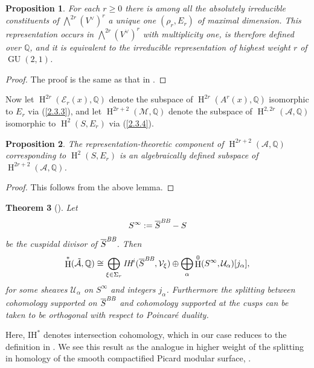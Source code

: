 \documentclass[12pt,a4paper,reqno]{amsart}
\theoremstyle{definition}
\numberwithin{definition}{subsection}
\theoremstyle{definition}
\numberwithin{Definition}{subsection}
\theoremstyle{remark}
\theoremstyle{remark}
\numberwithin{Remark}{subsection}
\theoremstyle{remark}
\theoremstyle{plain}
\newtheorem{Theorem}{Theorem}
\numberwithin{Theorem}{subsection}
\theoremstyle{plain}
\theoremstyle{plain}
\theoremstyle{plain}
\theoremstyle{plain}
\theoremstyle{plain}
\theoremstyle{plain}
\newtheorem{Proposition}[Theorem]{Proposition}
\theoremstyle{plain}
\newcommand*{\Q}{\mathbb{Q}}
\DeclareMathOperator{\GU}{GU}
\DeclareMathOperator{\h}{H}
\begin{document}
\begin{Proposition}
For each $r\geq 0$ there is among all the absolutely irreducible constituents of $\bigwedge^{2r} (V^{\vee})^r$ a unique one $(\rho_r, E_{r})$ of maximal dimension. This representation occurs in $\bigwedge^{2r} (V^{\vee})^r$ with multiplicity one, is therefore defined over $\Q$, and it is equivalent to the irreducible representation of highest weight $r$ of $\GU(2,1)$.
\end{Proposition}

\begin{proof}
The proof is the same as that in \cite[p. 16]{gordon}.
\end{proof}

Now let $\h^{2r}(\mathcal{E}_{r}(x),\Q)$ denote the subspace of $\h^{2r}(A^r(x),\Q)$ isomorphic to $E_{r}$ via (\ref{2.3.3}), and let $\h^{2r+2}(\mathcal{M}, \Q)$ denote the subspace of $\h^{2,2r}(\mathcal{A},\Q)$ isomorphic to $\h^2(S, E_{r})$ via (\ref{2.3.4}).

\begin{Proposition}
The representation-theoretic component of $\h^{2r+2}(\mathcal{A},\Q)$ corresponding to $\h^2(S, E_{r})$ is an algebraically defined subspace of $\h^{2r+2}(\mathcal{A},\Q)$.
\end{Proposition}

\begin{proof}
This follows from the above lemma.
\end{proof}

\begin{Theorem}[]
Let $$S^\infty:=\overline{S}^{\emph{BB}}-S$$
be the cuspidal divisor of $\overline{S}^{\emph{BB}}$. Then
\[
\h^{*}(\tilde{\mathcal{A}},\Q)\cong \bigoplus_{\xi\in \Sigma_r}\emph{IH}^i(\overline{S}^{\emph{BB}}, \mathcal{V}_\xi)\oplus \bigoplus_\alpha \h^0(S^\infty,\mathcal{U}_\alpha)[j_\alpha],
\]
for some sheaves $\mathcal{U}_\alpha$ on $S^\infty$ and integers $j_\alpha$. Furthermore the splitting between cohomology supported on $\overline{S}^{\emph{BB}}$ and cohomology supported at the cusps can be taken to be orthogonal with respect to Poincaré duality.
\end{Theorem}

Here, $\text{IH}^*$ denotes intersection cohomology, which in our case reduces to the definition in \cite[Equation (2.3.1)]{gordon2}. We see this result as the analogue in higher weight of the splitting in homology of the smooth compactified Picard modular surface, \cite[p. 125]{cogdell}.
\end{document}
